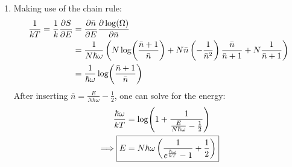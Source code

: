 \documentclass[11pt,a4paper]{scrartcl}
\newcommand{\nbar}{\ensuremath{\bar{n}}}
\begin{document}
\begin{enumerate}[label=\textbf{\large(\alph*)}, itemsep=2\baselineskip]
\item
    Making use of the chain rule:
    \begin{align*}
        \frac{1}{kT} = \frac{1}{k}\pdv{S}{E}
        &= \pdv{\nbar}{E}\pdv{\log(\Omega)}{\nbar} \\
        &= \frac{1}{N\hbar\omega}\left(N\log(\frac{\nbar+1}{\nbar})
        +N\nbar\left(-\frac{1}{\nbar^2}\right)\frac{\nbar}{\nbar+1}
        +N\frac{1}{\nbar+1}\right)\\
        &= \frac{1}{\hbar\omega}\log(\frac{\nbar+1}{\nbar})
    \end{align*}
    After inserting $\nbar=\frac{E}{N\hbar\omega}-\frac{1}{2}$, one can solve
    for the energy:
    \begin{align*}
        \frac{\hbar\omega}{kT} &=
        \log(1+\frac{1}{\frac{E}{N\hbar\omega}-\frac{1}{2}}) \\
        \implies \Aboxed{%
            E &=
            N\hbar\omega\left(\frac{1}{e^{\frac{\hbar\omega}{kT}}-1}+\frac{1}{2}\right)
        }
    \end{align*}

\end{enumerate}
\end{document}
